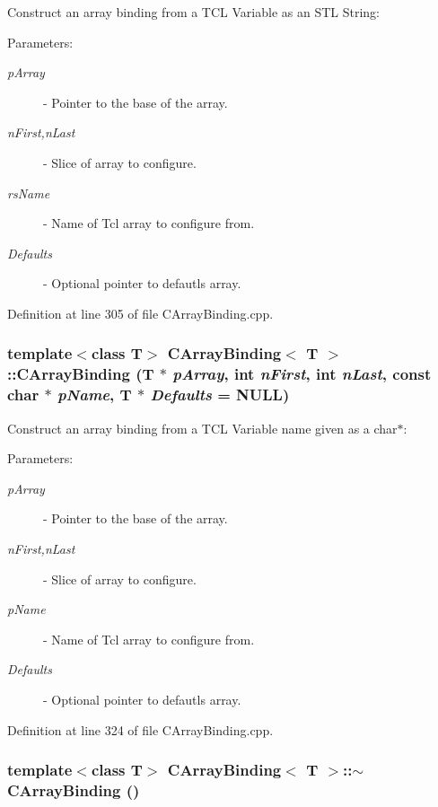 Construct an array binding from a TCL Variable as an STL String:\begin{Desc}
\item[Parameters: ]\par
\begin{description}
\item[{\em 
p\-Array}]- Pointer to the base of the array. \item[{\em 
n\-First,n\-Last}]- Slice of array to configure. \item[{\em 
rs\-Name}]- Name of Tcl array to configure from. \item[{\em 
Defaults}]- Optional pointer to defautls array. \end{description}
\end{Desc}


Definition at line 305 of file CArray\-Binding.cpp.
\subsubsection{\setlength{\rightskip}{0pt plus 5cm}template$<$class T$>$ CArray\-Binding$<$ T $>$::CArray\-Binding (T $\ast$ {\em p\-Array}, int {\em n\-First}, int {\em n\-Last}, const char $\ast$ {\em p\-Name}, T $\ast$ {\em Defaults} = NULL)}\label{classCArrayBinding_a1}


Construct an array binding from a TCL Variable name given as a char$\ast$: \begin{Desc}
\item[Parameters: ]\par
\begin{description}
\item[{\em 
p\-Array}]- Pointer to the base of the array. \item[{\em 
n\-First,n\-Last}]- Slice of array to configure. \item[{\em 
p\-Name}]- Name of Tcl array to configure from. \item[{\em 
Defaults}]- Optional pointer to defautls array. \end{description}
\end{Desc}


Definition at line 324 of file CArray\-Binding.cpp.
\subsubsection{\setlength{\rightskip}{0pt plus 5cm}template$<$class T$>$ CArray\-Binding$<$ T $>$::$\sim$CArray\-Binding ()\hspace{0.3cm}{\tt  [inline]}}\label{classCArrayBinding_a2}




